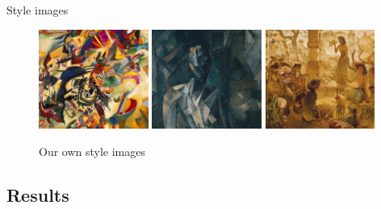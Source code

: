 \documentclass{beamer}
\begin{document}
    \begin{frame}{Style images}

        \begin{figure}
            \includegraphics[width=0.32\textwidth]{compo}
            \hfill
            \includegraphics[width=0.32\textwidth]{femme}
            \hfill
            \includegraphics[width=0.32\textwidth]{bali}
            \caption{\label{fig:noisy}Our own style images}
        \end{figure}

    \end{frame}

    \subsection{Results}
\end{document}
